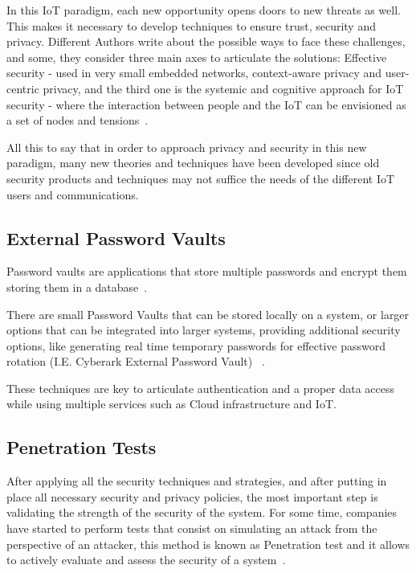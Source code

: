 In this IoT paradigm, each new opportunity opens doors to
new threats as well. This makes it necessary to develop
techniques to ensure trust, security and privacy. 
Different Authors write about the possible ways to
face these challenges, and some, they consider three
main axes to articulate the solutions: Effective 
security - used in very small embedded networks,
context-aware privacy and user-centric privacy, and the
third one is the systemic and cognitive approach for
IoT security - where the interaction between people
and the IoT can be envisioned as a set of nodes and 
tensions~\cite{riahi2014systemic}.

All this to say that in order to approach privacy and 
security in this new paradigm, many new theories and techniques
have been developed since old security products and techniques 
may not suffice the needs of the different IoT users and
communications.


\subsection{External Password Vaults}

Password vaults are applications that store multiple passwords 
and encrypt them storing them in a 
database~\cite{chatterjee2015cracking}.

There are small Password Vaults that can be stored locally
on a system, or larger options that can be integrated into
larger systems, providing additional security options, like
generating real time temporary passwords for effective
password rotation (I.E. Cyberark External Password Vault)
~\cite{nelson2015practical}.

These techniques are key to articulate authentication and a 
proper data access while using multiple services such as 
Cloud infrastructure and IoT.

\subsection{Penetration Tests}

After applying all the security techniques and strategies, and
after putting in place all necessary security and privacy 
policies, the most important step is validating the strength
of the security of the system. For some time, companies have
started to perform tests that consist on simulating an attack
from the perspective of an attacker, this method is known as
Penetration test and it allows to actively evaluate and assess 
the security of a system~\cite{shivayogimathoverview}.

